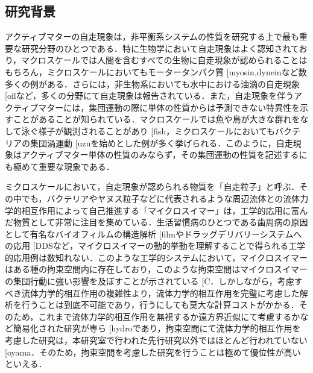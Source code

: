 \documentclass[11pt,a4j]{jarticle}
\makeatletter
\DeclareRobustCommand\cite{\unskip
\@ifnextchar[{\@tempswatrue\@citex}{\@tempswafalse\@citex[]}}
\makeatother
\begin{document}
\subsection{研究背景}
\par アクティブマターの自走現象は，非平衡系システムの性質を研究する上で最も重要な研究分野のひとつである．特に生物学において自走現象はよく認知されており，マクロスケールでは人間を含むすべての生物に自走現象が認められることはもちろん，ミクロスケールにおいてもモータータンパク質\cite{myosin,dynein}など数多くの例がある．さらには，非生物系においても水中における油滴の自走現象\cite{oil}など，多くの分野にて自走現象は報告されている．また，自走現象を伴うアクティブマターには，集団運動の際に単体の性質からは予測できない特異性を示すことがあることが知られている．マクロスケールでは魚や鳥が大きな群れをなして泳ぐ様子が観測されることがあり\cite{fish}，ミクロスケールにおいてもバクテリアの集団渦運動\cite{uzu}を始めとした例が多く挙げられる．このように，自走現象はアクティブマター単体の性質のみならず，その集団運動の性質を記述するにも極めて重要な現象である．
\par ミクロスケールにおいて，自走現象が認められる物質を「自走粒子」と呼ぶ．その中でも，バクテリアやヤヌス粒子などに代表されるような周辺流体との流体力学的相互作用によって自己推進する「マイクロスイマー」は，工学的応用に富んだ物質として非常に注目を集めている．生活習慣病のひとつである歯周病の原因として有名なバイオフィルムの構造解析\cite{film}やドラッグデリバリーシステムへの応用\cite{DDS}など，マイクロスイマーの動的挙動を理解することで得られる工学的応用例は数知れない．このような工学的システムにおいて，マイクロスイマーはある種の拘束空間内に存在しており，このような拘束空間はマイクロスイマーの集団行動に強い影響を及ぼすことが示されている\cite{C}．しかしながら，考慮すべき流体力学的相互作用の複雑性より，流体力学的相互作用を完璧に考慮した解析を行うことは到底不可能であり，行うにしても莫大な計算コストがかかる．そのため，これまで流体力学的相互作用を無視するか遠方界近似にて考慮するかなど簡易化された研究が専ら\cite{hydro}であり，拘束空間にて流体力学的相互作用を考慮した研究は，本研究室で行われた先行研究以外ではほとんど行われていない\cite{oyama}．そのため，拘束空間を考慮した研究を行うことは極めて優位性が高いといえる．
\end{document}
